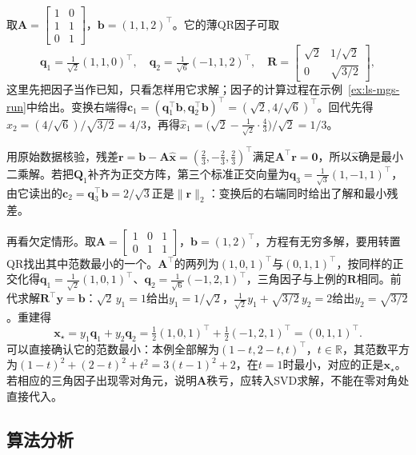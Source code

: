 \begin{example}[由QR因子求最小二乘解]
\label{ex:ls-qr-solve-run}
取$\bm A=\left[\begin{smallmatrix}1&0\\1&1\\0&1\end{smallmatrix}\right]$，$\bm b=(1,1,2)^\top$。它的薄QR因子可取
\[
 \bm q_1=\tfrac1{\sqrt2}(1,1,0)^\top,\quad
 \bm q_2=\tfrac1{\sqrt6}(-1,1,2)^\top,\quad
 \bm R=\begin{bmatrix}\sqrt2&1/\sqrt2\\0&\sqrt{3/2}\end{bmatrix},
\]
这里先把因子当作已知，只看怎样用它求解；因子的计算过程在示例~\ref{ex:ls-mgs-run}中给出。变换右端得$\bm c_1=(\bm q_1^\top\bm b,\bm q_2^\top\bm b)^\top=(\sqrt2,4/\sqrt6)^\top$。回代先得$\hat x_2=(4/\sqrt6)/\sqrt{3/2}=4/3$，再得$\hat x_1=\bigl(\sqrt2-\tfrac1{\sqrt2}\cdot\tfrac43\bigr)/\sqrt2=1/3$。

用原始数据核验，残差$\bm r=\bm b-\bm A\hat{\bm x}=(\tfrac23,-\tfrac23,\tfrac23)^\top$满足$\bm A^\top\bm r=\bm0$，所以$\hat{\bm x}$确是最小二乘解。若把$\bm Q_1$补齐为正交方阵，第三个标准正交向量为$\bm q_3=\tfrac1{\sqrt3}(1,-1,1)^\top$，由它读出的$\bm c_2=\bm q_3^\top\bm b=2/\sqrt3$正是$\lVert\bm r\rVert_2$：变换后的右端同时给出了解和最小残差。
\end{example}

\begin{example}[转置QR给出最小范数解]
\label{ex:ls-qr-min-norm-run}
再看欠定情形。取$\bm A=\left[\begin{smallmatrix}1&0&1\\0&1&1\end{smallmatrix}\right]$，$\bm b=(1,2)^\top$，方程有无穷多解，要用转置QR找出其中范数最小的一个。$\bm A^\top$的两列为$(1,0,1)^\top$与$(0,1,1)^\top$，按同样的正交化得$\bm q_1=\tfrac1{\sqrt2}(1,0,1)^\top$、$\bm q_2=\tfrac1{\sqrt6}(-1,2,1)^\top$，三角因子与上例的$\bm R$相同。前代求解$\bm R^\top\bm y=\bm b$：$\sqrt2\,y_1=1$给出$y_1=1/\sqrt2$，$\tfrac1{\sqrt2}y_1+\sqrt{3/2}\,y_2=2$给出$y_2=\sqrt{3/2}$。重建得
\[
 \bm x_\star=y_1\bm q_1+y_2\bm q_2=\tfrac12(1,0,1)^\top+\tfrac12(-1,2,1)^\top=(0,1,1)^\top .
\]
可以直接确认它的范数最小：本例全部解为$(1-t,2-t,t)^\top$，$t\in\mathbb R$，其范数平方为$(1-t)^2+(2-t)^2+t^2=3(t-1)^2+2$，在$t=1$时最小，对应的正是$\bm x_\star$。若相应的三角因子出现零对角元，说明$\bm A$秩亏，应转入SVD求解，不能在零对角处直接代入。
\end{example}

\subsection{算法分析}

